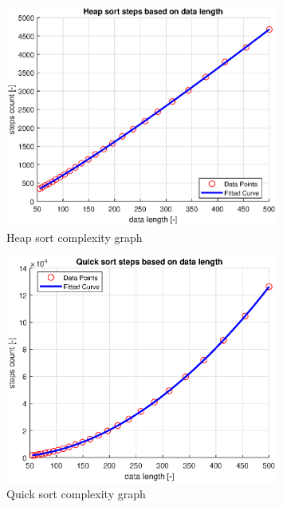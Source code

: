\documentclass[oneside]{article}
\begin{document}
\begin{figure}[H]
    \centering
    \includegraphics[width = 0.8\textwidth]{hs_count_figure.eps}
    \caption{Heap sort complexity graph}
    \label{fig:hs_count}
\end{figure}

\begin{figure}[H]
    \centering
    \includegraphics[width = 0.8\textwidth]{qs_count_figure.eps}
    \caption{Quick sort complexity graph}
    \label{fig:qs_count}
\end{figure}
\end{document}
